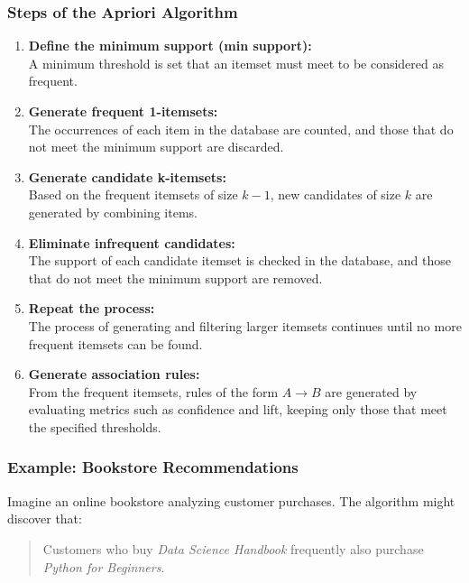 \documentclass[runningheads]{llncs}
\begin{document}
\subsubsection{Steps of the Apriori Algorithm}

\begin{enumerate}
	\item \textbf{Define the minimum support (min support):} \\
	A minimum threshold is set that an itemset must meet to be considered as frequent.
	
	\item \textbf{Generate frequent 1-itemsets:} \\
	The occurrences of each item in the database are counted, and those that do not meet the minimum support are discarded.
	
	\item \textbf{Generate candidate k-itemsets:} \\
	Based on the frequent itemsets of size \(k-1\), new candidates of size \(k\) are generated by combining items.
	
	\item \textbf{Eliminate infrequent candidates:} \\
	The support of each candidate itemset is checked in the database, and those that do not meet the minimum support are removed.
	
	\item \textbf{Repeat the process:} \\
	The process of generating and filtering larger itemsets continues until no more frequent itemsets can be found.
	
	\item \textbf{Generate association rules:} \\
	From the frequent itemsets, rules of the form \(A \rightarrow B\) are generated by evaluating metrics such as confidence and lift, keeping only those that meet the specified thresholds.
\end{enumerate}
\subsubsection{Example: Bookstore Recommendations}

Imagine an online bookstore analyzing customer purchases. The algorithm might discover that:

\begin{quote}
	Customers who buy \textit{Data Science Handbook} frequently also purchase \textit{Python for Beginners}.
\end{quote}
\end{document}
